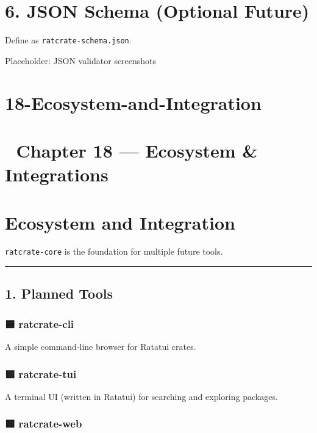 \documentclass[
  letterpaper,
  DIV=11,
  numbers=noendperiod]{scrreprt}
\begin{document}
\chapter{6. JSON Schema (Optional
Future)}\label{json-schema-optional-future}

Define as \texttt{ratcrate-schema.json}.

Placeholder: JSON validator screenshots

\chapter{18-Ecosystem-and-Integration}\label{ecosystem-and-integration}

\chapter{📘 Chapter 18 --- Ecosystem \&
Integrations}\label{chapter-18-ecosystem-integrations}

\chapter{Ecosystem and Integration}\label{ecosystem-and-integration-1}

\texttt{ratcrate-core} is the foundation for multiple future tools.

\begin{center}\rule{0.5\linewidth}{0.5pt}\end{center}

\section{1. Planned Tools}\label{planned-tools}

\subsection{🟦 ratcrate-cli}\label{ratcrate-cli-1}

A simple command-line browser for Ratatui crates.

\subsection{🟥 ratcrate-tui}\label{ratcrate-tui-1}

A terminal UI (written in Ratatui) for searching and exploring packages.

\subsection{🟩 ratcrate-web}\label{ratcrate-web}
\end{document}
